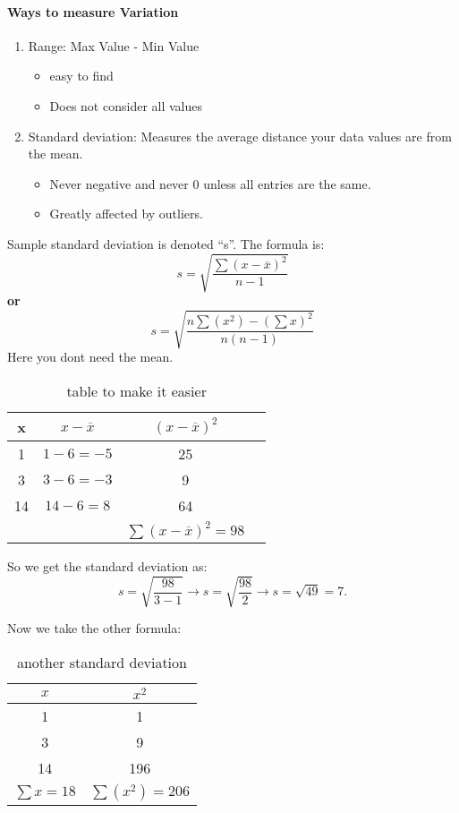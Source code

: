 \paragraph{Ways to measure Variation}
\begin{enumerate}
    \item Range: Max Value - Min Value
        \begin{itemize}
            \item easy to find
            \item Does not consider all values
        \end{itemize}
    \item Standard deviation: 
        Measures the average distance your data values are from the mean.
        \begin{itemize}
            \item Never negative and never 0 unless all entries are the same.
            \item Greatly affected by outliers.
        \end{itemize}
\end{enumerate}
Sample standard deviation is denoted ``s''.
The formula is:
\[s= \sqrt{\frac{\sum (x-\overline{x})^2}{n-1}}  \] 
\textbf{or}
\[s= \sqrt{\frac{n\sum (x^2) - (\sum x)^2 }{n(n-1)}}   \] 
Here you dont need the mean.


\vspace{50pt}

\begin{table}[htbp]
    \centering
    \begin{tabular}{c|c|c|c}
        x & $x-\overline{x}$ & $(x-\overline{x})^2$ & \\
        \midrule
        1  & $1-6=-5$ & 25 &  \\
        3  & $3-6=-3$ & 9  &  \\
        14 & $14-6=8$ & 64 &  \\
        \midrule
           &          &$\sum (x-\overline{x})^2 = 98$
    \end{tabular}
    \caption{table to make it easier}
\end{table}

So we get the standard deviation as:
\[
    s= \sqrt{\frac{98}{3-1}} \to s=\sqrt{\frac{98}{2}} \to s=\sqrt{49} = 7
.\] 

Now we take the other formula:
\begin{table}[htbp]
    \centering
    \begin{tabular}{c|c}
        \toprule
        $x$ & $x^2$ \\
        \midrule
        1 & 1 \\
        3 & 9 \\
        14 & 196 \\
        \midrule
        $\sum x=18$ & $\sum(x^2)=206$ \\
        \bottomrule
    \end{tabular}
    \caption{another standard deviation }
\end{table}

